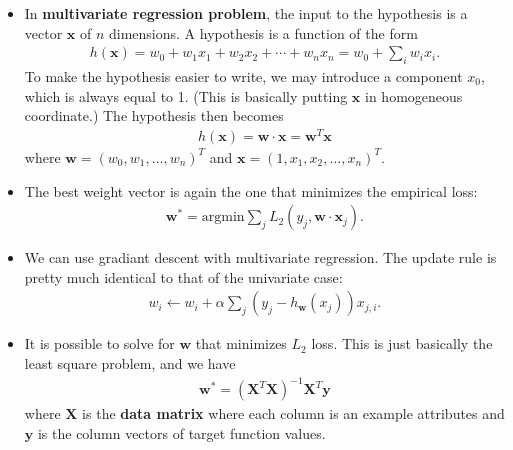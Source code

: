 \documentclass[10pt]{article}
\begin{document}
\begin{itemize}
    \item In {\bf multivariate regression problem}, the
        input to the hypothesis is a vector $\mathbf{x}$
        of $n$ dimensions. A hypothesis is a function
        of the form
        \begin{align*}
            h(\mathbf{x}) = w_0 + w_1x_1 + w_2x_2 + \dotsb +
                w_nx_n = w_0 + \sum_{i} w_i x_i.
        \end{align*}
        To make the hypothesis easier to write, we may
        introduce a component $x_0$, which is always equal
        to 1. (This is basically putting $\mathbf{x}$
        in homogeneous coordinate.) The hypothesis then becomes
        \begin{align*}
            h(\mathbf{x}) = \mathbf{w} \cdot \mathbf{x}
            = \mathbf{w}^T \mathbf{x}
        \end{align*}
        where $\mathbf{w} = (w_0, w_1, \dotsc, w_n)^T$
        and $\mathbf{x} = (1, x_1, x_2, \dotsc, x_n)^T$.
        
    \item The best weight vector is again the one that minimizes
        the empirical loss:
        \begin{align*}
            \mathbf{w}^* = \mathrm{argmin} \sum_{j} L_2(y_j, 
            \mathbf{w} \cdot \mathbf{x}_j).            
        \end{align*}
        
    \item We can use gradiant descent with multivariate regression.
        The update rule is pretty much identical to that
        of the univariate case:
        \begin{align*}
            w_i \gets w_i + \alpha \sum_{j} (y_j - h_\mathbf{w}(x_j)) x_{j,i}.
        \end{align*}
        
    \item It is possible to solve for $\mathbf{w}$ that minimizes
        $L_2$ loss. This is just basically the least square
        problem, and we have
        \begin{align*}
            \mathbf{w}^*
            = (\mathbf{X}^T \mathbf{X})^{-1} \mathbf{X}^T 
            \mathbf{y}            
        \end{align*}
        where $\mathbf{X}$ is the {\bf data matrix}
        where each column is an example attributes
        and $\mathbf{y}$ is the column vectors of
        target function values.
        

\end{itemize}
\end{document}

